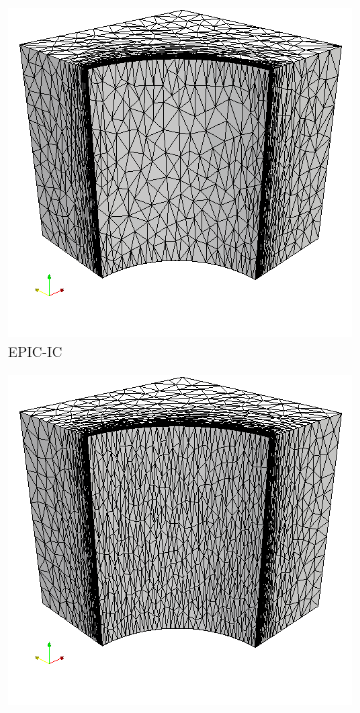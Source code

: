 \documentclass[3p,times,procedia,number]{elsarticle}
\begin{document}
\begin{figure}
\begin{subfigure}{.24\textwidth}
\centering
\includegraphics[width=\textwidth]{epic-ic-cube-cylinder-polar-2.png}
\caption{EPIC-IC}
\end{subfigure}
\begin{subfigure}{.24\textwidth}
\centering
\includegraphics[width=\textwidth]{epic-ics-cube-cylinder-polar-2.png}

\end{subfigure}
\end{figure}
\end{document}
